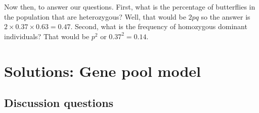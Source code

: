 \documentclass[
  a4paper]{book}
\begin{document}
Now then, to answer our questions. First, what is the percentage of butterflies in the population that are heterozygous? Well, that would be \(2pq\) so the answer is \(2 \times 0.37\times 0.63 = 0.47\). Second, what is the frequency of homozygous dominant individuals? That would be \(p^2\) or \(0.37^2 = 0.14\).

\section{Solutions: Gene pool model}\label{solutions-gene-pool-model}

\subsection{Discussion questions}\label{discussion-questions}
\end{document}
